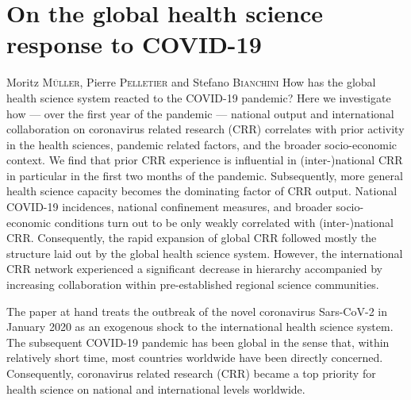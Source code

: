 \chapter{On the global health science response to COVID-19}

\begin{chapabstract}{\small Moritz \textsc{M\"uller}, \small Pierre \textsc{Pelletier} and \small Stefano \textsc{Bianchini}} %
How has the global health science system reacted to the COVID-19 pandemic? Here we investigate how --- over the first year of the pandemic --- national output and international collaboration on coronavirus related research (CRR) correlates with prior activity in the health sciences, pandemic related factors, and the broader socio-economic context. We find that prior CRR experience is influential in (inter-)national CRR in particular in the first two months of the pandemic. Subsequently, more general health science capacity becomes the dominating factor of CRR output. National COVID-19 incidences, national confinement measures, and broader socio-economic conditions turn out to be only weakly correlated with (inter-)national CRR. Consequently, the rapid expansion of global CRR followed mostly the structure laid out by the global health science system. However, the international CRR network experienced a significant decrease in hierarchy accompanied by increasing collaboration within pre-established regional science communities. 
\end{chapabstract}
\newpage


The paper at hand treats the outbreak of the novel coronavirus Sars-CoV-2 in January 2020 as an exogenous shock to the international health science system. The subsequent COVID-19 pandemic has been global in the sense that, within relatively short time, most countries worldwide have been directly concerned. Consequently, coronavirus related research (CRR) became a top priority for health science on national and international levels worldwide.

